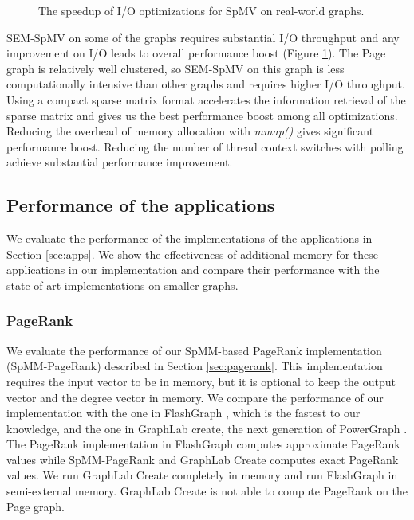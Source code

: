 \begin{figure}
	\begin{center}
		\footnotesize
		
		\caption{The speedup of I/O optimizations for SpMV on real-world graphs.}
		\label{perf:spmm_opt_io}
	\end{center}
\end{figure}

SEM-SpMV on some of the graphs requires substantial I/O throughput and
any improvement on I/O leads to overall performance boost (Figure
\ref{perf:spmm_opt_io}). The Page graph is relatively well clustered, so
SEM-SpMV on this graph is less computationally intensive than other graphs
and requires higher I/O throughput.
Using a compact sparse matrix format accelerates the information retrieval
of the sparse matrix and gives us the best performance boost among all
optimizations. Reducing the overhead of memory allocation with \textit{mmap()}
gives significant performance boost. Reducing the number of thread context
switches with polling achieve substantial performance improvement. 

\subsection{Performance of the applications}

We evaluate the performance of the implementations of the applications in
Section \ref{sec:apps}. We show the effectiveness of additional memory for
these applications in our implementation and compare their performance
with the state-of-art implementations on smaller graphs.

\subsubsection{PageRank}
We evaluate the performance of our SpMM-based PageRank implementation
(SpMM-PageRank) described
in Section \ref{sec:pagerank}. This implementation requires the input vector
to be in memory, but it is optional to keep the output vector and the degree
vector in memory. We compare the performance of our implementation with
the one in FlashGraph \cite{flashgraph}, which is the fastest to our knowledge,
and the one in GraphLab create, the next generation of
PowerGraph \cite{powergraph}. The PageRank implementation in FlashGraph computes
approximate PageRank values while SpMM-PageRank and GraphLab Create computes
exact PageRank values. We run GraphLab Create completely in memory and run
FlashGraph in semi-external memory. GraphLab Create is not able to compute
PageRank on the Page graph.

